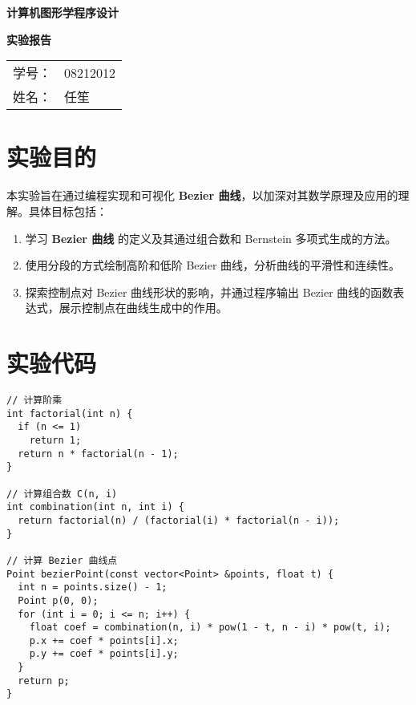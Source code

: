 \documentclass[a4paper,12pt]{article}
\begin{document}
\begin{titlepage}
    \centering
    \vspace*{3cm} %

    {\Huge \textbf{计算机图形学程序设计}\par}
    \vspace{0.5cm}
    {\Huge \textbf{实验报告}\par}

    \vspace{8cm} %

    {\Large
    \begin{tabular}{rl}
        学号： & 08212012 \\
        姓名： & 任笙
    \end{tabular}
    \par}

    \vfill %
\end{titlepage}

\section{实验目的}


本实验旨在通过编程实现和可视化 \textbf{Bezier 曲线}，以加深对其数学原理及应用的理解。具体目标包括：
\begin{enumerate}
    \item 学习 \textbf{Bezier 曲线} 的定义及其通过组合数和 Bernstein 多项式生成的方法。
    \item 使用分段的方式绘制高阶和低阶 Bezier 曲线，分析曲线的平滑性和连续性。
    \item 探索控制点对 Bezier 曲线形状的影响，并通过程序输出 Bezier 曲线的函数表达式，展示控制点在曲线生成中的作用。
\end{enumerate}

\section{实验代码}
\begin{verbatim}
// 计算阶乘
int factorial(int n) {
  if (n <= 1)
    return 1;
  return n * factorial(n - 1);
}

// 计算组合数 C(n, i)
int combination(int n, int i) {
  return factorial(n) / (factorial(i) * factorial(n - i));
}

// 计算 Bezier 曲线点
Point bezierPoint(const vector<Point> &points, float t) {
  int n = points.size() - 1;
  Point p(0, 0);
  for (int i = 0; i <= n; i++) {
    float coef = combination(n, i) * pow(1 - t, n - i) * pow(t, i);
    p.x += coef * points[i].x;
    p.y += coef * points[i].y;
  }
  return p;
}
\end{verbatim}
\end{document}
